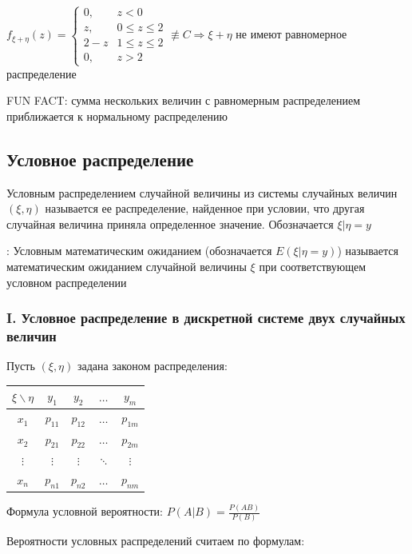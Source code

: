 \documentclass[12pt]{article}
\begin{document}
    $f_{\xi + \eta}(z) = \begin{cases}0, & z < 0 \\ z, & 0 \leq z \leq 2 \\ 2 - z & 1 \leq z \leq 2 \\ 0, & z > 2\end{cases} \not\equiv C \Longrightarrow \xi + \eta$ не имеют равномерное распределение

    \Nota FUN FACT: сумма нескольких величин с равномерным распределением приближается к нормальному распределению

    \subsection{Условное распределение}

    \Def Условным распределением случайной величины из системы случайных величин $(\xi, \eta)$ 
    называется ее распределение, найденное при условии, что другая случайная величина приняла 
    определенное значение. Обозначается $\xi | \eta = y$

    : Условным математическим ожиданием (обозначается $E(\xi | \eta = y)$) называется 
    математическим ожиданием случайной величины $\xi$ при соответствующем условном распределении

    \subsubsection{I. Условное распределение в дискретной системе двух случайных величин}

    Пусть $(\xi, \eta)$ задана законом распределения:

    \begin{tabular}{c|c|c|c|c}
        $\xi \backslash \eta$ & $y_1$ & $y_2$ & $\dots$ & $y_m$ \\
        \hline
        $x_1$ & $p_{11}$ & $p_{12}$ & $\dots$ & $p_{1m}$ \\
        \hline
        $x_2$ & $p_{21}$ & $p_{22}$ & $\dots$ & $p_{2m}$ \\
        \hline
        $\vdots$ & $\vdots$ & $\vdots$ & $\ddots$ & $\vdots$ \\
        \hline
        $x_n$ & $p_{n1}$ & $p_{n2}$ & $\dots$ & $p_{nm}$ \\
    \end{tabular}

    Формула условной вероятности: $P(A | B) = \frac{P(AB)}{P(B)}$

    Вероятности условных распределений считаем по формулам:
\end{document}
